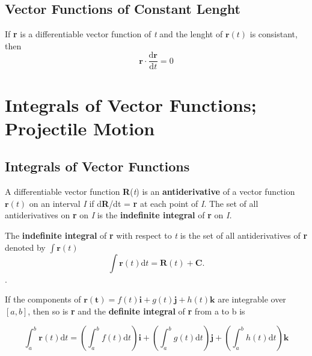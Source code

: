 \documentclass[12pt,a4paper]{article}
\newenvironment{definition}{\begin{definitionbox}}{\end{definitionbox}\vspace{1\baselineskip}}
\newenvironment{mynote}{\vspace{1\baselineskip}\begin{note}}{\end{note}\vspace{1\baselineskip}}
\begin{document}
\subsection{Vector Functions of Constant Lenght}

\begin{mynote}
If \textbf{r} is a differentiable vector function of \textit{t} and the lenght of \(\mathbf{r}(t)\) is consistant, then
\[\mathbf{r}\cdot \frac{\mathrm{d}\mathbf{r}}{\mathrm{d}t} = 0\]
\end{mynote}
\newpage
\section{Integrals of Vector Functions; Projectile Motion}

\subsection{Integrals of Vector Functions}

A differentiable vector function \textbf{R}(\textit{t}) is an \textbf{antiderivative} of a vector function \(\mathbf{r}(t)\) on an interval \textit{I} if d\textbf{R}/dt = \textbf{r} at each point of \textit{I}. 
The set of all antiderivatives on \textbf{r} on \textit{I} is the \textbf{indefinite integral} of \textbf{r} on \textit{I.}

\begin{definition}
  
  The \textbf{indefinite integral} of \textbf{r} with respect to \textit{t} is the set of all antiderivatives of \textbf{r} denoted by \(\int \mathbf{r}(t)\)
  \[\int\mathbf{r}(t)\mathrm{d}t = \mathbf{R}(t) + \mathbf{C}.\].



\end{definition}

\begin{definition}
  If the components of \(\mathbf{r(t)} = f(t)\mathbf{i} + g(t)\mathbf{j} + h(t)\mathbf{k}\) are integrable over \([a,b]\),
  then so is \textbf{r} and the \textbf{definite integral} of \textbf{r} from a to b is

  \[
    \int_{a}^{b}\mathbf{r}(t)\mathrm{d}t = \left(\int_{a}^{b} f(t)\mathrm{d}t \right)\mathbf{i} + \left(\int_{a}^{b} g(t)\mathrm{d}t \right)\mathbf{j} + \left(\int_{a}^{b} h(t)\mathrm{d}t \right)\mathbf{k}
    \]
    


\end{definition}
\end{document}
